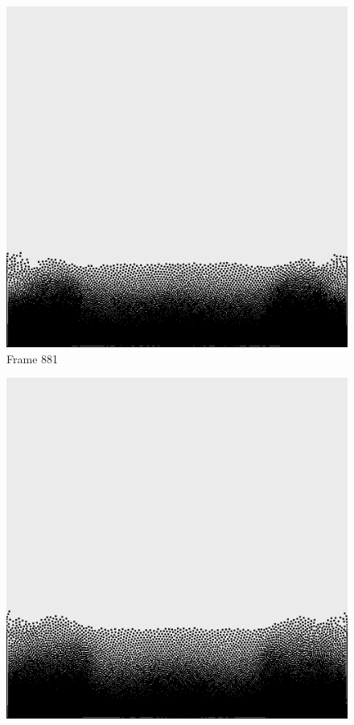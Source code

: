 \documentclass[a4paper, 12pt, oneside]{book}
\begin{document}
\begin{figure}[!ht]
    \addvspace{0.5ex}
        \begin{center}
            \includegraphics[width=\linewidth]{images/test_case_1/881.png}
            Frame 881
        \end{center}
    \endminipage
    \hfill
        \begin{center}
            \includegraphics[width=\linewidth]{images/test_case_1/901.png}

\end{center}
\end{figure}
\end{document}
